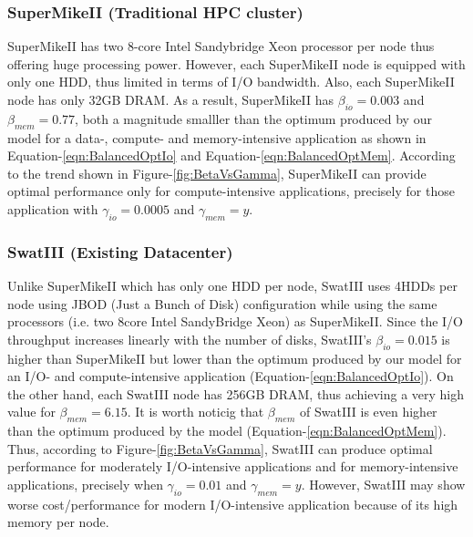 \documentclass[journal]{IEEEtran}
\begin{document}
\subsubsection{SuperMikeII (Traditional HPC cluster)}
SuperMikeII has two 8-core Intel Sandybridge Xeon processor per node thus offering huge processing power. However, each SuperMikeII node is equipped with only one HDD, thus limited in terms of I/O bandwidth. Also, each SuperMikeII node has only 32GB DRAM. As a result, SuperMikeII has $\beta_{io}=0.003$ and $\beta_{mem}=0.77$, both a magnitude smalller than the optimum produced by our model for a data-, compute- and memory-intensive application as shown in Equation-\ref{eqn:BalancedOptIo} and Equation-\ref{eqn:BalancedOptMem}. According to the trend shown in Figure-\ref{fig:BetaVsGamma}, SuperMikeII can provide optimal performance only for compute-intensive applications, precisely for those application with $\gamma_{io}=0.0005$ and $\gamma_{mem}=y$.  
\subsubsection{SwatIII (Existing Datacenter)}
Unlike SuperMikeII which has only one HDD per node, SwatIII uses 4HDDs per node using JBOD (Just a Bunch of Disk) configuration while using the same processors (i.e. two 8core Intel SandyBridge Xeon) as SuperMikeII. Since the I/O throughput increases linearly with the number of disks, SwatIII's $\beta_{io}=0.015$ is higher than SuperMikeII but lower than the optimum produced by our model for an I/O- and compute-intensive application (Equation-\ref{eqn:BalancedOptIo}). On the other hand, each SwatIII node has 256GB DRAM, thus achieving a very high value for $\beta_{mem}=6.15$. It is worth noticig that $\beta_{mem}$ of SwatIII is even higher than the optimum produced by the model (Equation-\ref{eqn:BalancedOptMem}). Thus, according to Figure-\ref{fig:BetaVsGamma}, SwatIII can produce optimal performance for moderately I/O-intensive applications and for memory-intensive applications, precisely when $\gamma_{io} = 0.01$ and $\gamma_{mem}=y$. However, SwatIII may show worse cost/performance for modern I/O-intensive application because of its high memory per node. 
\end{document}
